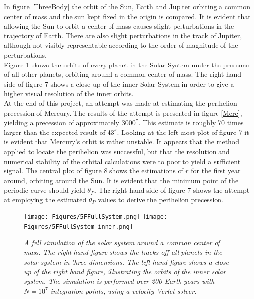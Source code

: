 \documentclass[%
reprint,nofootinbib,
amsmath,amssymb,
aps,
]{revtex4-1}
\begin{document}
\newpage 

\twocolumngrid

\noindent 
In figure \ref{ThreeBody} the orbit of the Sun, Earth and Jupiter orbiting a common center of mass and the sun kept fixed in the origin is compared. It is evident that allowing the Sun to orbit a center of mass causes slight perturbations in the trajectory of Earth. There are also slight perturbations in the track of Jupiter, although not visibly representable according to the order of magnitude of the perturbations. \\ \indent 
Figure \ref{SolarSystem} shows the orbits of every planet in the Solar System under the presence of all other planets, orbiting around a common center of mass. The right hand side of figure 7 shows a close up of the inner Solar System in order to give a higher visual resolution of the inner orbits. \\  \indent 
At the end of this project, an attempt was made at estimating the perihelion precession of Mercury. The results of the attempt is presented in figure \ref{Merc}, yielding a precession of approximately 3000$^{''}$. This estimate is roughly 70 times larger than the expected result of 43$^{''}$. Looking at the left-most plot of figure 7 it is evident that Mercury's orbit is rather unstable. It appears that the method applied to locate the perihelion was successful, but that the resolution and numerical stability of the orbital calculations were to poor to yield a sufficient signal. The central plot of figure 8 shows the estimations of $r$ for the first year around, orbiting around the Sun. It is evident that the minimum point of the periodic curve should yield $\theta_P$. The right hand side of figure 7 shows the attempt at employing the estimated $\theta_P$ values to derive the perihelion precession. 

\onecolumngrid

\newpage 

\vspace{2cm}

\begin{figure}[H]
	\texttt{[image: Figures/5FFullSystem.png]} 
	\texttt{[image: Figures/5FFullSystem\_inner.png]} \vspace{5mm}
	\caption{\label{SolarSystem} \textit{A full simulation of the solar system around a common center of mass. The right hand figure shows the tracks off all planets in the solar system in three dimensions. The left hand figure shows a close up of the right hand figure, illustrating the orbits of the inner solar system. The simulation is performed over 200 Earth years with $N = 10^7$ integration points, using a velocity Verlet solver.}}
\end{figure}
\end{document}
